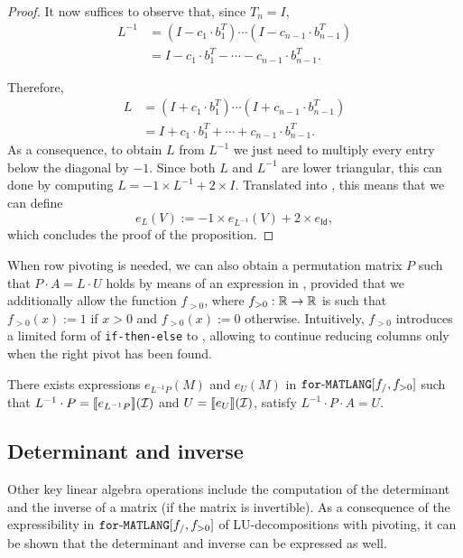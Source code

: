 \begin{proof}
    It now suffices to observe that, since $T_n=I$,
    \begin{align*}
    L^{-1}&=(I-c_1\cdot b_1^T)\cdots (I-c_{n-1}\cdot  b_{n-1}^T) \\
    &=I-c_1\cdot b_1^T-\cdots - c_{n-1}\cdot b_{n-1}^T.
    \end{align*}
    
	Therefore,    
    \begin{align*}
    L&=(I+c_1\cdot b_1^T)\cdots (I+c_{n-1}\cdot b_{n-1}^T) \\
    &=I+c_1\cdot b_1^T+\cdots + c_{n-1}\cdot b_{n-1}^T.
    \end{align*}
    As a consequence, to obtain $L$ from $L^{-1}$ we just need to multiply every entry below the diagonal by $-1$. Since both  $L$ and $L^{-1}$ are lower triangular, this can done 
    by computing $L=-1\times L^{-1} + 2\times I$. Translated into \langfor, this means that we can define
    $$
    e_{L}(V) :=  -1\times e_{L^{-1}}(V) + 2\times e_{\mathsf{Id}},
    $$
    which concludes the proof of the proposition.    
\end{proof}



\smallskip

When row pivoting is needed, we can also obtain a permutation matrix
$P$ such that $P\cdot A=L\cdot U$ holds by means of an expression in \langfor, provided
that we additionally allow the function $f_{>0}$, 
where $f_{>0}:\mathbb{R}\to\mathbb{R}$ is such that $f_{>0}(x):=1$ if $x>0$ and $f_{>0}(x):=0$ otherwise.
Intuitively, $f_{>0}$ introduces a limited form of \texttt{if-then-else} to \langfor, allowing to continue reducing columns only when the right pivot has been found.

\begin{proposition}\label{prop:palu}
There exists expressions $e_{L^{-1}P}(M)$ and $e_U(M)$ in $\texttt{for}\text{-}\texttt{MATLANG}[f_/,f_{>0}]$  such that
$L^{-1}\cdot P=\llbracket e_{L^{-1}P} \rrbracket(\mathcal{I})$ and $U=\llbracket e_U \rrbracket(\mathcal{I})$, satisfy $L^{-1}\cdot P\cdot A=U$.
\end{proposition}




\subsection{Determinant and inverse}\label{sec:queries:inverse}
Other key linear algebra operations include the computation of the determinant and
the inverse of a matrix (if the matrix is invertible). As a consequence of the expressibility
in $\texttt{for}\text{-}\texttt{MATLANG}[f_/,f_{>0}]$ of LU-decompositions with pivoting, it can be shown that the determinant
and inverse can be expressed as well. 

